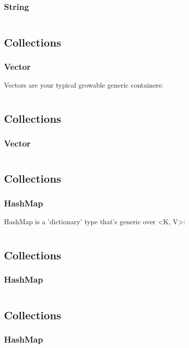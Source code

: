 \documentclass[usenames,twocolumn,dvipsnames,10pt,a4wide]{article}
\begin{document}
	\subsubsection{String}
	\inputminted[fontsize=\normalsize]{rust}{code/string3.rs}


\subsection{Collections}
	\subsubsection{Vector}
	Vectors are your typical growable generic containers:
	\inputminted[fontsize=\normalsize]{rust}{code/vector.rs}


\subsection{Collections}
	\subsubsection{Vector}
	\inputminted[fontsize=\normalsize]{rust}{code/vector1.rs}


\subsection{Collections}
	\subsubsection{HashMap}
	HashMap is a 'dictionary' type that's generic over <K, V>:
	\inputminted[fontsize=\normalsize]{rust}{code/hashmap.rs}


\subsection{Collections}
	\subsubsection{HashMap}
	\inputminted[fontsize=\normalsize]{rust}{code/hashmap1.rs}


\subsection{Collections}
	\subsubsection{HashMap}
	\inputminted[fontsize=\normalsize]{rust}{code/hashmap2.rs}
\end{document}
